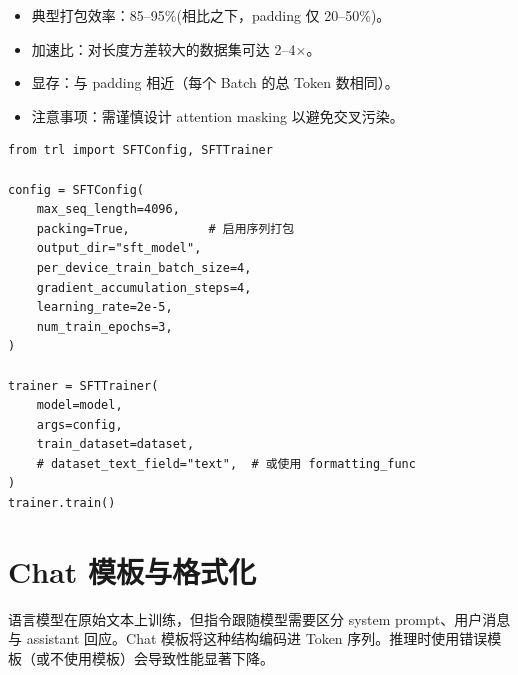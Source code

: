 \begin{keybox}[打包效率]
\begin{itemize}
  \item 典型打包效率：85--95\%(相比之下，padding 仅 20--50\%)。
  \item 加速比：对长度方差较大的数据集可达 2--4$\times$。
  \item 显存：与 padding 相近（每个 Batch 的总 Token 数相同）。
  \item 注意事项：需谨慎设计 attention masking 以避免交叉污染。
\end{itemize}
\end{keybox}

\begin{examplebox}
\begin{lstlisting}[style=pythonstyle]
from trl import SFTConfig, SFTTrainer

config = SFTConfig(
    max_seq_length=4096,
    packing=True,           # 启用序列打包
    output_dir="sft_model",
    per_device_train_batch_size=4,
    gradient_accumulation_steps=4,
    learning_rate=2e-5,
    num_train_epochs=3,
)

trainer = SFTTrainer(
    model=model,
    args=config,
    train_dataset=dataset,
    # dataset_text_field="text",  # 或使用 formatting_func
)
trainer.train()
\end{lstlisting}
\end{examplebox}

\section{Chat 模板与格式化}
\label{sec:chat-templates}

\begin{intuitionbox}[为何 Chat 模板重要]
语言模型在原始文本上训练，但指令跟随模型需要区分 system prompt、用户消息与 assistant 回应。Chat 模板将这种结构编码进 Token 序列。推理时使用错误模板（或不使用模板）会导致性能显著下降。
\end{intuitionbox}


